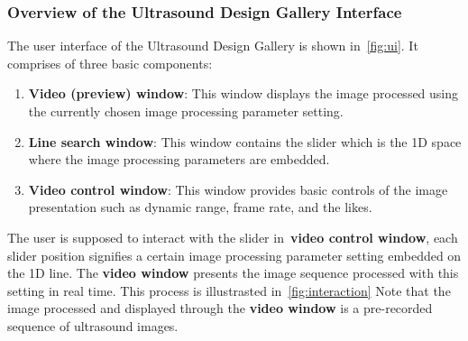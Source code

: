 \subsubsection{Overview of the Ultrasound Design Gallery Interface}
The user interface of the Ultrasound Design Gallery is shown in~\cref{fig:ui}.
It comprises of three basic components:
    \vspace{0.05in}
\begin{enumerate}
  \item[\ding{228}] \textbf{Video (preview) window}: This window displays the image processed using the currently chosen image processing parameter setting.
    \vspace{0.05in}
  \item[\ding{228}] \textbf{Line search window}: This window contains the slider which is the 1D space where the image processing parameters are embedded.
    \vspace{0.05in}
  \item[\ding{228}] \textbf{Video control window}: This window provides basic controls of the image presentation such as dynamic range, frame rate, and the likes.
\end{enumerate}
The user is supposed to interact with the slider in~\textbf{video control window}, each slider position signifies a certain image processing parameter setting embedded on the 1D line.
The \textbf{video window} presents the image sequence processed with this setting in real time.
This process is illustrasted in~\cref{fig:interaction}
Note that the image processed and displayed through the \textbf{video window} is a pre-recorded sequence of ultrasound images.

